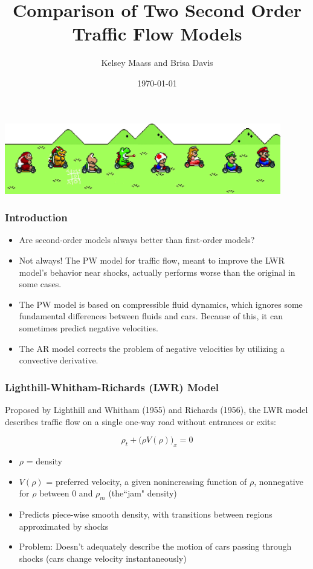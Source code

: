\documentclass{beamer}
\title[Short title]{Comparison of Two Second Order Traffic Flow Models} %
\author{Kelsey Maass and Brisa Davis} %
\institute[UW] %
{
AMATH 574 \\ %
Group 6
\medskip
}
\date{\today} %
\begin{document}
\begin{frame}
\titlepage %
\includegraphics[width=4.75in]{mariokart.png}
\end{frame}

\begin{frame}
\frametitle{Introduction} 
\begin{itemize}
\item Are second-order models always better than first-order models?
\item Not always! The PW model for traffic flow, meant to improve the LWR model's behavior near shocks, actually performs worse than the original in some cases.
\item The PW model is based on compressible fluid dynamics, which ignores some fundamental differences between fluids and cars. Because of this, it can sometimes predict negative velocities.
\item The AR model corrects the problem of negative velocities by utilizing a convective derivative.
\end{itemize}
\end{frame}


\begin{frame}
\frametitle{Lighthill-Whitham-Richards (LWR) Model}

Proposed by Lighthill and Whitham (1955) and Richards (1956), the LWR model describes traffic flow on a single one-way road without entrances or exits:

\[ \rho_t + \Big(\rho V(\rho)\Big)_x = 0 \]

\begin{itemize}
\item $\rho$ = density
\item $V(\rho)$  = preferred velocity, a given nonincreasing function of $\rho$, nonnegative for $\rho$ between 0 and $\rho_m$ (the``jam" density)
\item Predicts piece-wise smooth density, with transitions between regions approximated by shocks
\item Problem: Doesn't adequately describe the motion of cars passing through shocks (cars change velocity instantaneously) 
\end{itemize}

\end{frame}
\end{document}
